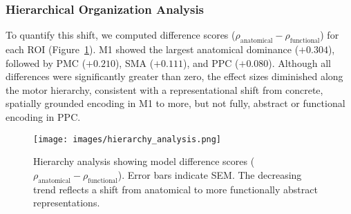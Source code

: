 \documentclass{article}
\begin{document}





\subsubsection{Hierarchical Organization Analysis}
To quantify this shift, we computed difference scores (\(\rho_{\text{anatomical}} - \rho_{\text{functional}}\)) for each ROI (Figure~\ref{fig:hierarchy_analysis}). M1 showed the largest anatomical dominance (\(+0.304\)), followed by PMC (\(+0.210\)), SMA (\(+0.111\)), and PPC (\(+0.080\)). Although all differences were significantly greater than zero, the effect sizes diminished along the motor hierarchy, consistent with a representational shift from concrete, spatially grounded encoding in M1 to more, but not fully, abstract or functional encoding in PPC.
\begin{figure}[!htbp]
\centering
\texttt{[image: images/hierarchy\_analysis.png]}
\caption{Hierarchy analysis showing model difference scores (\(\rho_{\text{anatomical}} - \rho_{\text{functional}}\)). Error bars indicate SEM. The decreasing trend reflects a shift from anatomical to more functionally abstract representations.}
\label{fig:hierarchy_analysis}
\end{figure}
\end{document}
